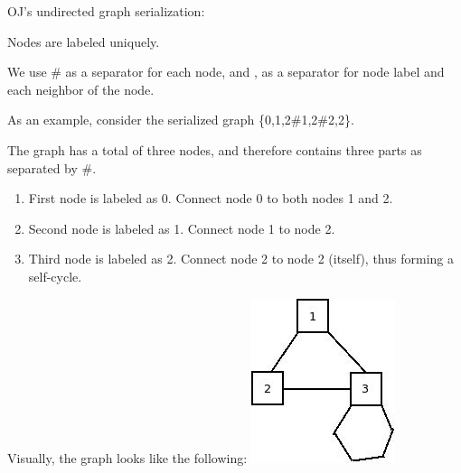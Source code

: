 \documentclass[12pt]{book}
\begin{document}
OJ's undirected graph serialization:

Nodes are labeled uniquely.

We use \# as a separator for each node, and , as a separator for node label and each neighbor of the node.

As an example, consider the serialized graph \{0,1,2\#1,2\#2,2\}.

The graph has a total of three nodes, and therefore contains three parts as separated by \#.

\begin{enumerate}
\item First node is labeled as 0. Connect node 0 to both nodes 1 and 2.
\item Second node is labeled as 1. Connect node 1 to node 2.
\item Third node is labeled as 2. Connect node 2 to node 2 (itself), thus forming a self-cycle.
\end{enumerate}

Visually, the graph looks like the following:
\includegraphics[width=.9\linewidth]{./pic/clonegraph.jpg}
\end{document}

